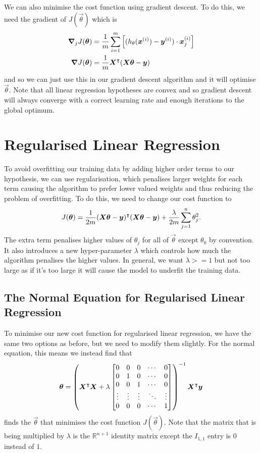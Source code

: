 We can also minimise the cost function using gradient descent. To do this, we need the gradient of $J(\vec{\theta})$ which is
\begin{align}
    \bm{\nabla}_j J(\bm{\theta}) &= \frac{1}{m} \sum_{i=1}^{m}\left[(h_{\theta}(\bm{x}^{(i)})-\bm{y}^{(i)})\cdot\bm{x}^{(i)}_j\right] \\
    \bm{\nabla} J(\bm{\theta}) &= \frac{1}{m} \bm{X}^{\intercal}(\bm{X\theta} - \bm{y})
\end{align}
and so we can just use this in our gradient descent algorithm and it will optimise $\vec{\theta}$. Note that all linear regression hypotheses are convex and so gradient descent
will always converge with a correct learning rate and enough iterations to the global optimum.

\section{Regularised Linear Regression}

To avoid overfitting our training data by adding higher order terms to our hypothesis, we can use regularisation, which penalises larger weights for each term
causing the algorithm to prefer lower valued weights and thus reducing the problem of overfitting. To do this, we need to change our cost function to
\begin{equation}
    J(\bm{\theta}) = \frac{1}{2m}(\bm{X}\bm{\theta} - \bm{y})^{\intercal}(\bm{X}\bm{\theta} - \bm{y}) + \frac{\lambda}{2m} \sum_{j=1}^{n}\theta_j^2.
\end{equation}
The extra term penalises higher values of $\theta_j$ for all of $\vec{\theta}$ except $\theta_0$ by convention. It also introduces a new hyper-parameter $\lambda$
which controls how much the algorithm penalises the higher values. In general, we want $\lambda>=1$ but not too large as if it's too large it will cause the model
to underfit the training data.

\subsection{The Normal Equation for Regularised Linear Regression}
To minimise our new cost function for regularised linear regression, we have the same two options as before, but we need to modify them slightly. For the normal equation,
this means we instead find that
\begin{equation}
    \bm{\theta} = \left( \bm{X}^{\intercal}\bm{X} + \lambda \begin{bmatrix}
        0 & 0 & 0 & \cdots & 0 \\
        0 & 1 & 0 & \cdots & 0 \\
        0 & 0 & 1 & \cdots & 0 \\
        \vdots & \vdots & \vdots & \ddots & \vdots \\
        0 & 0 & 0 & \cdots & 1
    \end{bmatrix} \right)^{-1} \bm{X}^{\intercal}\bm{y}
\end{equation}
finds the $\vec{\theta}$ that minimises the cost function $J(\vec{\theta})$. Note that the matrix that is being multiplied by $\lambda$ is the $\mathbb{R}^{n+1}$ identity
matrix except the $I_{1,1}$ entry is $0$ instead of $1$.

